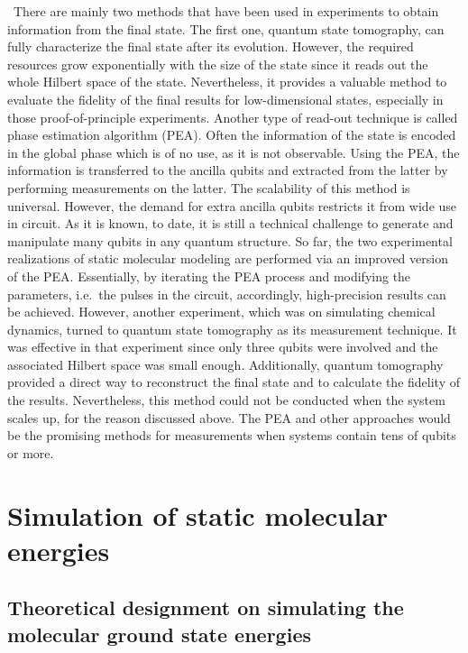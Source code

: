 \documentclass[8.5pt,twoside,twocolumn]{article}
\begin{document}
\ There are mainly two methods that have been used in
experiments to obtain information from the final state.
The first one, quantum state tomography, can fully
characterize the final state after its evolution.
However, the required resources grow exponentially
with the size of the state since it reads out the whole
Hilbert space of the state. Nevertheless, it provides a valuable method
to evaluate the fidelity of the final results
for low-dimensional states, especially in those proof-of-principle experiments.
Another type of read-out technique is called
phase estimation algorithm (PEA).\cite{PEA_1,PEA_2,PEA_3,PEA_4}
Often the information of the state is encoded in the global phase
which is of no use, as it is not observable.
Using the PEA, the information is transferred to the ancilla qubits
and extracted from the latter by performing measurements on the latter.
The scalability of this method is universal.
However, the demand for extra ancilla qubits
restricts it from wide use in circuit.
As it is known, to date, it is still a technical challenge
to generate and manipulate many qubits in any quantum structure.
So far, the two experimental realizations of static molecular modeling
are performed via an improved version of
the PEA.\cite{Optics_static,NMR_static}
Essentially, by iterating the PEA process
and modifying the parameters, i.e.\
the pulses in the circuit, accordingly,
high-precision results can be achieved.
However, another experiment,\cite{NMR_dynamic}
which was on simulating chemical dynamics,
turned to quantum state tomography as its measurement technique.
It was effective in that experiment
since only three qubits were involved
and the associated Hilbert space was small enough.
Additionally, quantum tomography provided a direct way
to reconstruct the final state and to calculate the fidelity
of the results. Nevertheless,
this method could not be conducted when the system scales up,
for the reason discussed above.
The PEA and other approaches\cite{Other_measuring_methods_1,Other_measuring_methods_2,Other_measuring_methods_3,Other_measuring_methods_4}
would be the promising methods for measurements
when systems contain tens of qubits or more.

\section{Simulation of static molecular energies}

\subsection{Theoretical designment on simulating the molecular ground state energies}
\end{document}
